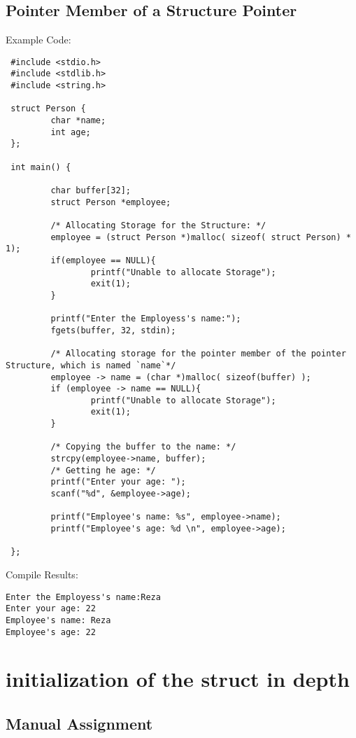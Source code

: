 \subsection{Pointer Member of a Structure Pointer}
Example Code:
\begin{lstlisting} 
 #include <stdio.h>
 #include <stdlib.h>
 #include <string.h>

 struct Person {
         char *name;
         int age;
 };

 int main() {

         char buffer[32];
         struct Person *employee;

         /* Allocating Storage for the Structure: */
         employee = (struct Person *)malloc( sizeof( struct Person) * 1);
         if(employee == NULL){
                 printf("Unable to allocate Storage");
                 exit(1);
         }

         printf("Enter the Employess's name:");
         fgets(buffer, 32, stdin);

         /* Allocating storage for the pointer member of the pointer Structure, which is named `name`*/
         employee -> name = (char *)malloc( sizeof(buffer) );
         if (employee -> name == NULL){
                 printf("Unable to allocate Storage");
                 exit(1);
         }

         /* Copying the buffer to the name: */
         strcpy(employee->name, buffer);
         /* Getting he age: */
         printf("Enter your age: ");
         scanf("%d", &employee->age);

         printf("Employee's name: %s", employee->name);
         printf("Employee's age: %d \n", employee->age);

 };
\end{lstlisting}

Compile Results:
\begin{lstlisting} 
Enter the Employess's name:Reza
Enter your age: 22
Employee's name: Reza
Employee's age: 22
\end{lstlisting}

\section{initialization of the struct in depth}
\subsection{Manual Assignment}
